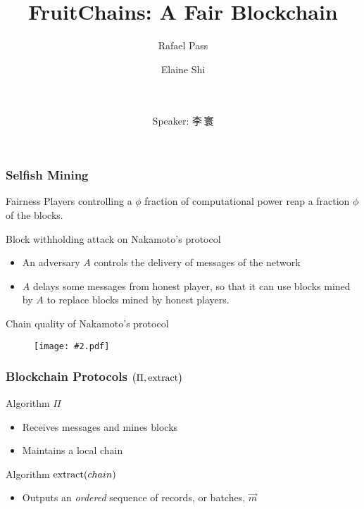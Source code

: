 \documentclass{beamer}
\title{FruitChains: A Fair Blockchain}
\author{Rafael Pass\inst{1} \and Elaine Shi\inst{2}}
\date{
\\ \quad \\ Speaker:\quad
李\,寰 \vspace{-25pt}
}
\institute[Cornell University] %
{
  \inst{1}%
  Department of Computer Science\\
  Cornell Tech
  \and
  \inst{2}%
  Department of Computer Science\\
  Cornell University
}
\newcommand{\insfig}[2][1]{
	\begin{figure}
		\texttt{[image: \#2.pdf]}
	\end{figure}
}
\begin{document}
\begin{spacing}{1.2}

\frame{\titlepage}
\note{
	\vspace{70pt}
	\Huge{\centerline{\LaTeX}}
}


\begin{frame}
	\frametitle{Selfish Mining}
	\begin{block}{Fairness}
		Players controlling a $\phi$ fraction of computational power reap a fraction $\phi$ of the blocks.
	\end{block}
	\begin{block}{Block withholding attack on Nakamoto's protocol}
		\begin{itemize}
			\item An adversary $A$ controls the delivery of messages of the network
			\item $A$ delays some messages from honest player, so that 
it can use blocks mined by $A$ to replace blocks mined by honest players.
		\end{itemize}
	\end{block}
	\begin{block}{Chain quality of Nakamoto's protocol}
		\insfig{BWA}
	\end{block}
\end{frame}

\begin{frame}
	\frametitle{Blockchain Protocols $\big(\Pi, {\rm extract}\big)$}
	\vspace{-3pt}
	\begin{block}{Algorithm $\Pi$}
		\begin{itemize}
			\item Receives messages and mines blocks
			\item Maintains a local chain
		\end{itemize}
	\end{block}
	\begin{block}{Algorithm ${\rm extract}(chain)$}
		\begin{itemize}
			\item Outputs an \textit{ordered} sequence of records, or batches, $\vec{m}$ 
		\end{itemize}
	\end{block}
	

\end{frame}
\end{spacing}
\end{document}
